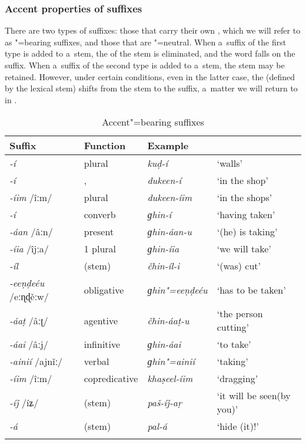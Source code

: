 \subsubsection*{Accent properties of suffixes}

There are two types of suffixes: those that carry their own , which we will refer to as
"=bearing suffixes, and those that are "=neutral. When a~suffix of the first type is added
to a~stem, the  of the stem is eliminated, and the word  falls on the suffix. When
a~suffix of the second type is added to a~stem, the stem  may be retained. However, under
certain conditions, even in the latter case, the  (defined by the lexical stem) shifts from
the stem to the suffix, a~matter we will return to in .

\begin{table}[ht]
\caption{Accent"=bearing suffixes}
\begin{tabularx}{\textwidth}{ l l l Q }
\lsptoprule
Suffix &
Function &
Example &
\\\hline
\textit{-í} &
plural &
\textit{kuḍ-í} &
`walls'\\
\textit{-í} &
,  &
\textit{dukeen-í} &
`in the shop'\\
\textit{-íim} /îːm/ &
plural  &
\textit{dukeen-íim} &
`in the shops'\\
\textit{-í} &
converb &
\textit{ɡhin-í} &
`having taken'\\
\textit{-áan} /âːn/ &
present &
\textit{ɡhin-áan-u} &
`(he) is taking'\\
\textit{-íia} /îjːa/ &
1 plural &
\textit{ɡhin-íia} &
`we will take'\\
\textit{-íl} &
 (stem) &
\textit{čhin-íl-i} &
`(was) cut'\\
\textit{-eeṇḍeéu} /eːɳɖěːw/ &
obligative &
\textit{ɡhin"=eeṇḍeéu} &
`has to be taken'\\
\textit{-áaṭ} /âːʈ/ &
agentive &
\textit{čhin-áaṭ-u} &
`the person cutting'\\
\textit{-áai} /âːj/ &
infinitive &
\textit{ɡhin-áai} &
`to take'\\
\textit{-ainií} /ajnǐː/ &
verbal  &
\textit{ɡhin"=ainií} &
`taking'\\
\textit{-íim} /îːm/ &
copredicative &
\textit{khaṣeel-íim} &
`dragging'\\
\textit{-íǰ} /íʑ/ &
 (stem) &
\textit{paš-íǰ-aṛ} &
`it will be seen\newline (by you)'\\
\textit{-á} &
 (stem) &
\textit{pal-á} &
`hide (it)!'\\\lspbottomrule
\end{tabularx}
\label{tab:3-5}
\end{table}


